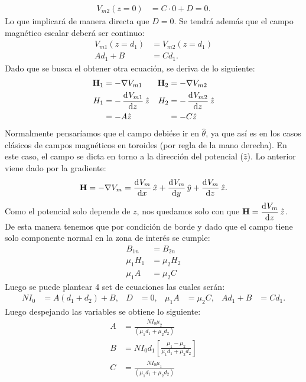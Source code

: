 \documentclass[
  11pt,
  letterpaper,
   answers
  ]{exam}
\begin{document}
\begin{questions}
\begin{solution}
\begin{parts}
  \begin{align}
    V_{m2}(z=0)  &= C\cdot 0+ D = 0.
  \end{align}
  Lo que implicará de manera directa que $D=0$. Se tendrá además que el campo magnético escalar deberá ser continuo:
  \begin{align}
    V_{m1}(z=d_{1}) &=V_{m2}(z=d_{1}) \\ A d_{1} + B &= C d_{1}.
  \end{align}
  Dado que se busca el obtener otra ecuación, se deriva de lo siguiente:
  \begin{align}
    \textbf{H}_{1}&= - \nabla V_{m1} &  
    \textbf{H}_{2} &= - \nabla V_{m2}\\
    {H}_{1}&= -\dod{V_{m1}}{z}\hat{z} & {H}_{2}&= -\dod{V_{m2}}{z}\hat{z}\\
    &= -A \hat{z} &  &= -C\hat{z}
  \end{align}
  Normalmente pensaríamos que el campo debiése ir en $\hat{\theta}$, ya que así es en los casos clásicos de campos magnéticos en toroides (por regla de la mano derecha). En este caso, el campo se dicta en torno a la dirección del potencial ($\hat{z}$). Lo anterior viene dado por la gradiente: 
  \begin{align}
      \textbf{H}= - \nabla V_{m}=\dod{V_m}{x}\hat{x}+\dod{V_m}{y}\hat{y}+\dod{V_m}{z}\hat{z}.
  \end{align} 
  Como el potencial solo depende de $z$, nos quedamos solo con que $\mathbf{H}=\dod{V_m}{z}\hat{z}$.\\
  De esta manera tenemos que por condición de borde y dado que el campo tiene solo componente normal en la zona de interés se cumple:
  \begin{align}
    B_{1n} &= B_{2n}\\
    \mu_{1}H_{1} &=  \mu_{2}H_{2}\\
    \mu_{1}A &=  \mu_{2}C   
  \end{align}
  Luego se puede plantear 4 set de ecuaciones las cuales serán:
  \begin{align}
    NI_{0} &= A(d_{1} + d_{2}) + B, & D&=0, & \mu_{1}A &=  \mu_{2}C, & Ad_{1} + B &= Cd_{1}.
  \end{align}
  Luego despejando las variables se obtiene lo siguiente:
    \begin{align}
      A &= \frac{N I_{0}\mu_2}{(\mu_1 d_1 +\mu_2 d_2)}\\
      B&= NI_0d_1 \left[ \frac{\mu_1 - \mu_2}{\mu_1 d_1 + \mu_2 d_2} \right] \\
      C&= \frac{NI_{0}\mu_{1}}{(\mu_1 d_1 + \mu_2 d_2)}\\

\end{align}
\end{parts}
\end{solution}
\end{questions}
\end{document}
